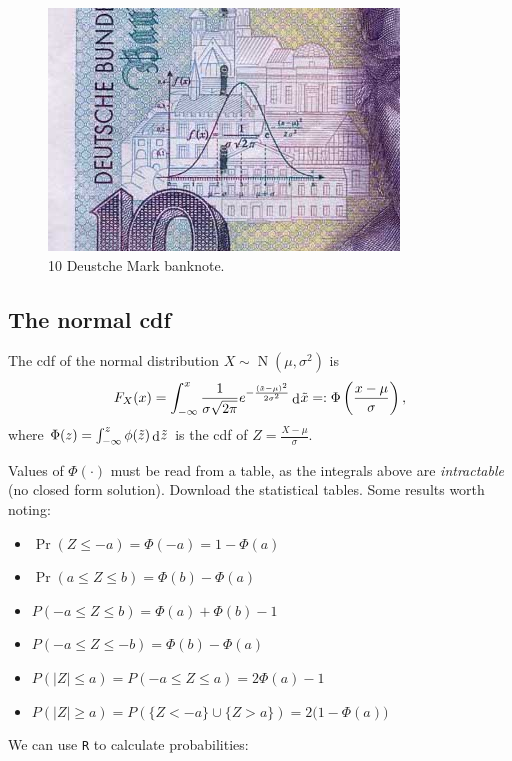 \documentclass[
]{book}
\providecommand{\tightlist}{%
  \setlength{\itemsep}{0pt}\setlength{\parskip}{0pt}}
\DeclareMathOperator{\N}{N}
\DeclareMathOperator{\dd}{d}
\newcommand{\dint}{\dd\hspace{0.5pt}\!}
\theoremstyle{definition}
\theoremstyle{definition}
\theoremstyle{definition}
\theoremstyle{definition}
\theoremstyle{remark}
\begin{document}
\begin{figure}

{\centering \includegraphics[width=0.6\linewidth]{figure/deutschemark} 

}

\caption{10 Deustche Mark banknote.}\label{fig:deutschemark}
\end{figure}

\hypertarget{the-normal-cdf}{%
\subsection{The normal cdf}\label{the-normal-cdf}}

The cdf of the normal distribution \(X\sim\N(\mu,\sigma^2)\) is
\[
F_X(x) = \int_{-\infty}^x 
\frac{1}{\sigma\sqrt{2\pi}}e^{-\frac{(\tilde x-\mu)^2}{2\sigma^2}} \dint \tilde x =: \Phi\left(\frac{x-\mu}{\sigma} \right),
\]
where \(\Phi(z)=\int_{-\infty}^z \phi(\tilde z) \dint \tilde z\) is the cdf of \(Z=\frac{X-\mu}{\sigma}\).

Values of \(\Phi(\cdot)\) must be read from a table, as the integrals above are \emph{intractable} (no closed form solution). Download the statistical tables.
Some results worth noting:

\begin{itemize}
\tightlist
\item
  \(\Pr(Z \leq -a)=\Phi(-a)=1-\Phi(a)\)
\item
  \(\Pr(a \leq Z \leq b) = \Phi(b) - \Phi(a)\)
\item
  \(P(-a \leq Z \leq b) = \Phi(a) + \Phi(b) - 1\)
\item
  \(P(-a \leq Z \leq -b) = \Phi(b) - \Phi(a)\)
\item
  \(P(|Z| \leq a) = P(-a \leq Z \leq a) = 2\Phi(a) - 1\)
\item
  \(P(|Z| \geq a) = P(\{Z < -a\} \cup \{Z >a\}) = 2\big(1-\Phi(a)\big)\)
\end{itemize}

We can use \texttt{R} to calculate probabilities:
\end{document}
